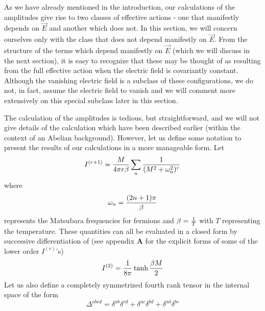 \documentclass[a4paper,12pt]{article}
\begin{document}
As we have already mentioned in the introduction, our calculations of
the amplitudes give rise to two classes of effective actions - one
that  manifestly depends on $\vec{E}$ and another which does not. In
this section, we will concern ourselves only with the class that does
not depend manifestly on $\vec{E}$. From the structure of the terms
which depend manifestly on $\vec{E}$ (which we will discuss in the
next section), it is easy to recognize that these may be thought of as
resulting from the full effective action when the electric field is
covariantly constant. Although the vanishing electric field is a
subclass of these configurations, we do not, in fact, assume the
electric field to vanish and we will comment more extensively on this
special subclass later in this section.

The calculation of the amplitudes is tedious, but straightforward, 
and we will not give details of the calculation which
have been described earlier \cite{Brandt:2000dd, Brandt:2001jc}
(within the  context of an Abelian
background). However, let us define some notation to
present the results of our calculations in a more manageable form. Let
\begin{equation}\label{Isum}
I^{(r+1)} = {M\over 4\pi r\beta} \sum_{n} {1\over
  (M^{2}+\omega_{n}^{2})^{r}}\label{4}
\end{equation}
where
\begin{equation}
\omega_{n} = {(2n+1)\pi\over \beta}
\end{equation}
represents the Matsubara frequencies for fermions and $\beta = {1\over
  T}$ with $T$ representing the temperature. These quantities
can all be evaluated in a closed form by successive differentiation of
(see appendix {\bf A} for the explicit forms of some of the lower order
$I^{(r)}$'s)
\begin{equation}
I^{(2)} = {1\over 8\pi} \tanh {\beta M\over 2}
\end{equation}
Let us also define a completely symmetrized fourth rank tensor in the
internal space of the form
\begin{equation}
\Delta^{abcd} = \delta^{ab}\delta^{cd} + \delta^{ac}\delta^{bd} +
\delta^{ad}\delta^{bc}\label{4a}
\end{equation}
\end{document}

